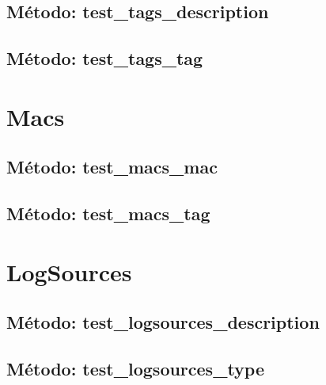 

\subsection{\quad Método: test\_tags\_description}



\subsection{\quad Método: test\_tags\_tag}



\section{\quad Macs}



\subsection{\quad Método: test\_macs\_mac}



\subsection{\quad Método: test\_macs\_tag}



\section{\quad LogSources}



\subsection{\quad Método: test\_logsources\_description}



\subsection{\quad Método: test\_logsources\_type}

